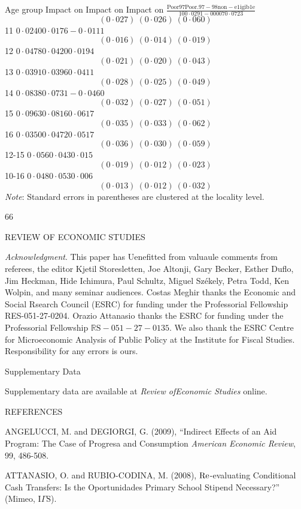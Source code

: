 Age group Impact on Impact on Impact on $\displaystyle \frac{\mathrm{P}\mathrm{o}\mathrm{o}\mathrm{r}97\mathrm{P}\mathrm{o}\mathrm{o}\mathrm{r}.97-98\mathrm{n}\mathrm{o}\mathrm{n}-\mathrm{e}1\mathrm{i}\mathrm{g}\mathrm{i}\mathrm{b}1\mathrm{e}}{100\cdot 0291-000070\cdot 0723}$
$$
(0\cdot 027)\ (0\cdot 026)\ (0\cdot 060)
$$
11 $0\cdot 0240 0\cdot 0176 -0\cdot 0111$
$$
(0\cdot 016)\ (0\cdot 014)\ (0\cdot 019)
$$
12 $0\cdot 0478 0\cdot 0420 0\cdot 0194$
$$
(0\cdot 021)\ (0\cdot 020)\ (0\cdot 043)
$$
13 $0\cdot 0391 0\cdot 0396 0\cdot 0411$
$$
(0\cdot 028)\ (0\cdot 025)\ (0\cdot 049)
$$
14 $0\cdot 0838 0\cdot 0731 -0\cdot 0460$
$$
(0\cdot 032)\ (0\cdot 027)\ (0\cdot 051)
$$
15 $0\cdot 0963 0\cdot 0816 0\cdot 0617$
$$
(0\cdot 035)\ (0\cdot 033)\ (0\cdot 062)
$$
16 $0\cdot 0350 0\cdot 0472 0\cdot 0517$
$$
(0\cdot 036)\ (0\cdot 030)\ (0\cdot 059)
$$
12-15 $0\cdot 056 0\cdot 043 0\cdot 015$
$$
(0\cdot 019)\ (0\cdot 012)\ (0\cdot 023)
$$
10-16 $0\cdot 048 0\cdot 053 0\cdot 006$
$$
(0\cdot 013)\ (0\cdot 012)\ (0\cdot 032)
$$
{\it Note}: Standard errors in parentheses are clustered at the locality level.

66

REVIEW OF ECONOMIC STUDIES

{\it Acknowledgment}. This paper has Uenefitted from valuaule comments from referees, the editor Kjetil Storesletten, Joe Altonji, Gary Becker, Esther Duflo, Jim Heckman, Hide Ichimura, Paul Schultz, Miguel Sz\'{e}kely, Petra Todd, Ken Wolpin, and many seminar audiences. Costas Meghir thanks the Economic and Social Rsearch Council (ESRC) for funding under the Professorial Fellowship RES-051-27-0204. Orazio Attanasio thanks the ESRC for funding under the Professorial Fellowship $\mathbb{R}\mathrm{S}-051-27-0135$. We also thank the ESRC Centre for Microeconomic Analysis of Public Policy at the Institute for Fiscal Studies. Responsibility for any errors is ours.

Supplementary Data

Supplementary data are available at {\it Review ofEconomic Studies} online.

REFERENCES

ANGELUCCI, M. and DEGIORGI, G. (2009), ``Indirect Effects of an Aid Program: The Case of Progresa and Consumption {\it American Economic Review}, 99, 486-508.

ATTANASIO, O. and RUBIO-CODINA, M. (2008), ${\rm Re}$-evaluating Conditional Cash Transfers: Is the Oportunidades Primary School Stipend Necessary?'' (Mimeo, $\mathrm{I}\Gamma \mathrm{S}$).

